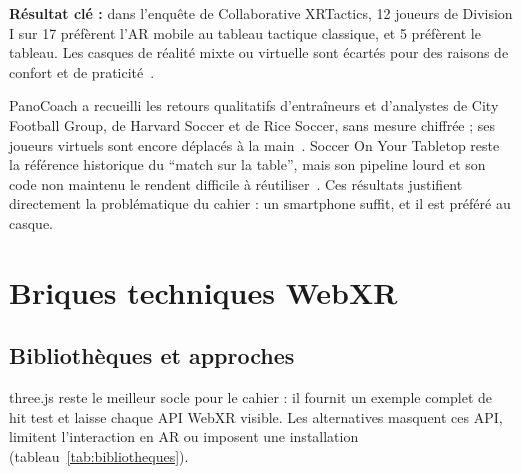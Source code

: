\documentclass[11pt,a4paper]{article}
\begin{document}
\begin{encadre}
\textbf{Résultat clé :} dans l'enquête de Collaborative XRTactics, 12 joueurs de Division I sur 17 préfèrent l'AR mobile au tableau tactique classique, et 5 préfèrent le tableau. Les casques de réalité mixte ou virtuelle sont écartés pour des raisons de confort et de praticité~\cite{xrtactics}.
\end{encadre}

PanoCoach a recueilli les retours qualitatifs d'entraîneurs et d'analystes de City Football Group, de Harvard Soccer et de Rice Soccer, sans mesure chiffrée ; ses joueurs virtuels sont encore déplacés à la main~\cite{panocoach}. Soccer On Your Tabletop reste la référence historique du \enquote{match sur la table}, mais son pipeline lourd et son code non maintenu le rendent difficile à réutiliser~\cite{tabletop}. Ces résultats justifient directement la problématique du cahier : un smartphone suffit, et il est préféré au casque.

\section{Briques techniques WebXR}

\subsection{Bibliothèques et approches}

three.js reste le meilleur socle pour le cahier : il fournit un exemple complet de hit test et laisse chaque API WebXR visible. Les alternatives masquent ces API, limitent l'interaction en AR ou imposent une installation (tableau~\ref{tab:bibliotheques}).
\end{document}
